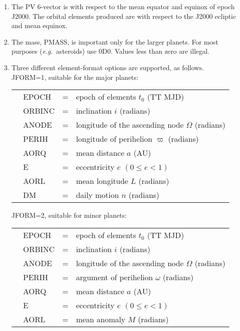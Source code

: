 \documentclass[11pt,twoside,nolof]{starlink}
\begin{document}
{
 \begin{enumerate}
  \item The PV 6-vector is with respect to the mean equator and equinox of
        epoch J2000.  The orbital elements produced are with respect to
        the J2000 ecliptic and mean equinox.
  \item The mass, PMASS, is important only for the larger planets.  For
        most purposes (\textit{e.g.}~asteroids) use 0D0.  Values less than zero
        are illegal.
  \item Three different element-format options are supported, as
        follows. \\

        JFORM=1, suitable for the major planets:

        \begin{tabular}{llll}
        & EPOCH  & = & epoch of elements $t_0$ (TT MJD) \\
        & ORBINC & = & inclination $i$ (radians) \\
        & ANODE  & = & longitude of the ascending node $\Omega$ (radians) \\
        & PERIH  & = & longitude of perihelion $\varpi$ (radians) \\
        & AORQ   & = & mean distance $a$ (AU) \\
        & E      & = & eccentricity $e$ $( 0 \leq e < 1 )$ \\
        & AORL   & = & mean longitude $L$ (radians) \\
        & DM     & = & daily motion $n$ (radians)
        \end{tabular}

        JFORM=2, suitable for minor planets:

        \begin{tabular}{llll}
        & EPOCH  & = & epoch of elements $t_0$ (TT MJD) \\
        & ORBINC & = & inclination $i$ (radians) \\
        & ANODE  & = & longitude of the ascending node $\Omega$ (radians) \\
        & PERIH  & = & argument of perihelion $\omega$ (radians) \\
        & AORQ   & = & mean distance $a$ (AU) \\
        & E      & = & eccentricity $e$ $( 0 \leq e < 1 )$ \\
        & AORL   & = & mean anomaly $M$ (radians)
        \end{tabular}


\end{enumerate}}
\end{document}
